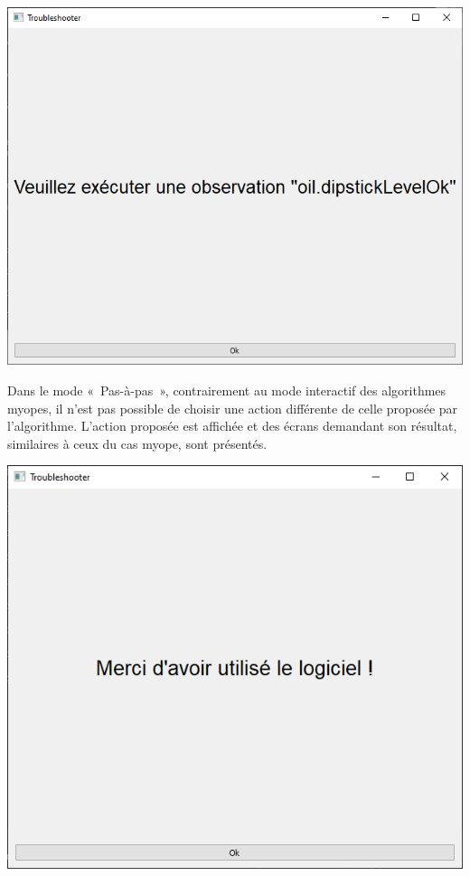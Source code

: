 \documentclass[a4paper,11pt]{article}
\theoremstyle{plain}
\theoremstyle{definition}
\begin{document}
\begin{center}
\includegraphics[scale=0.667]{Figures/exato_3_pas_a_pas1}
\end{center}
Dans le mode «~Pas-à-pas~», contrairement au mode interactif des algorithmes myopes, il n'est pas possible de choisir une action différente de celle proposée par l'algorithme. L'action proposée est affichée et des écrans demandant son résultat, similaires à ceux du cas myope, sont présentés.

\begin{center}
\includegraphics[scale=0.667]{Figures/fim}
\end{center}
\end{document}
